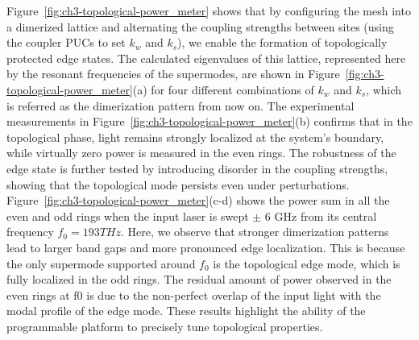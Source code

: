 Figure~\ref{fig:ch3-topological-power_meter} shows that by configuring the mesh into a dimerized lattice and alternating the coupling strengths between sites (using the coupler PUCs to set $k_w$ and $k_s$), we enable the formation of topologically protected edge states.
The calculated eigenvalues of this lattice, represented here by the resonant frequencies of the supermodes, are shown in Figure~\ref{fig:ch3-topological-power_meter}(a) for four different combinations of $k_w$ and $k_s$, which is referred as the dimerization pattern from now on.
The experimental measurements in Figure~\ref{fig:ch3-topological-power_meter}(b) confirms that in the topological phase, light remains strongly localized at the system’s boundary, while virtually zero power is measured in the even rings.
The robustness of the edge state is further tested by introducing disorder in the coupling strengths, showing that the topological mode persists even under perturbations.
Figure~\ref{fig:ch3-topological-power_meter}(c-d) shows the power sum in all the even and odd rings when the input laser is swept $\pm$ 6 GHz from its central frequency $f_0=193 THz$.
Here, we observe that stronger dimerization patterns lead to larger band gaps and more pronounced edge localization.
This is because the only supermode supported around $f_0$ is the topological edge mode, which is fully localized in the odd rings.
The residual amount of power observed in the even rings at f0 is due to the non-perfect overlap of the input light with the modal profile of the edge mode.
These results highlight the ability of the programmable platform to precisely tune topological properties.


